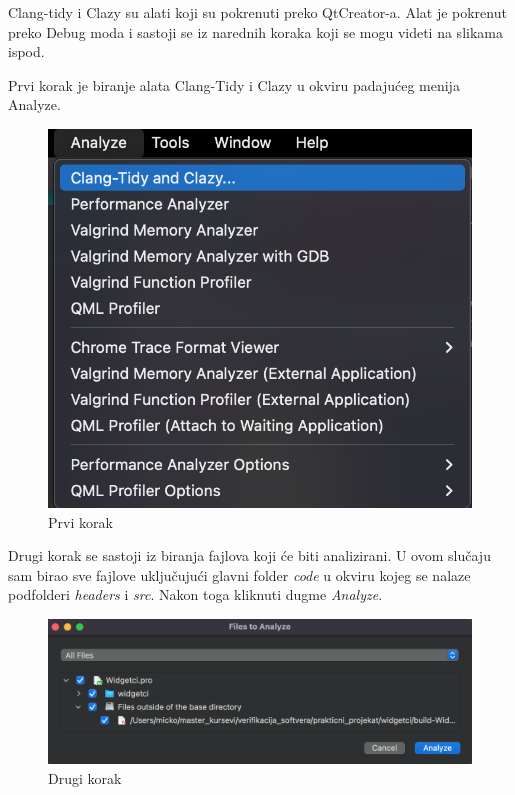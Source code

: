 \documentclass[a4paper]{article}
\begin{document}
Clang-tidy i Clazy su alati koji su pokrenuti preko QtCreator-a.
Alat je pokrenut preko Debug moda i sastoji se iz narednih koraka koji se mogu videti na slikama ispod.

Prvi korak je biranje alata Clang-Tidy i Clazy u okviru padajućeg menija Analyze.

\begin{figure}[h!]
\begin{center}
\includegraphics[scale=0.45]{clang-tidy-01.png}
\end{center}
\caption{Prvi korak}
\label{fig: clang-tidy-0}
\end{figure}

Drugi korak se sastoji iz biranja fajlova koji će biti analizirani. U ovom slučaju sam birao sve fajlove uključujući glavni folder \textit{code} u okviru kojeg se nalaze podfolderi \textit{headers} i \textit{src}. Nakon toga kliknuti dugme \textit{Analyze}.

\begin{figure}[h!]
\begin{center}
\includegraphics[scale=0.35]{clang-tidy-02.png}
\end{center}
\caption{Drugi korak}
\label{fig: clang-tidy-2}
\end{figure}
\end{document}
